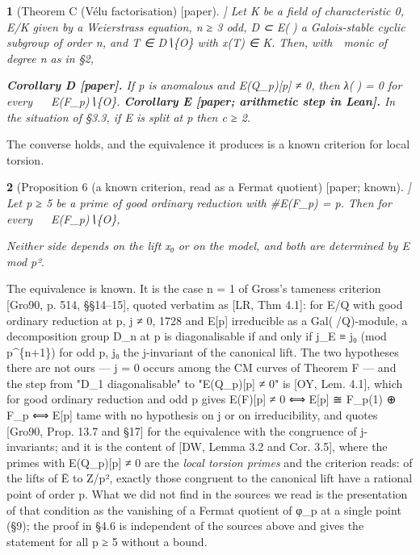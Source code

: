 \documentclass[11pt,a4paper]{article}
\theoremstyle{named}
\newtheorem*{namedthm}{}
\newcommand{\dispf}[1]{\par\smallskip{\centering #1\par}\smallskip}
\begin{document}
\begin{namedthm}[Theorem C (Vélu factorisation) [paper]]
Let K be a field of characteristic 0, E/K given by a Weierstrass equation, n ≥ 3 odd, D ⊂ E() a Galois-stable cyclic subgroup of order n, and T ∈ D∖\{O\} with x(T) ∈ K. Then, with  monic of degree n as in §2,
\dispf{φ\_n(x(T)) = (x(T))\textasciicircum{}n.}
\textbf{Corollary D [paper].} If p is anomalous and E(Q\_p)[p] ≠ 0, then λ() = 0 for every  ∈ E(F\_p)∖\{O\}.
\textbf{Corollary E [paper; arithmetic step in Lean].} In the situation of §3.3, if E is split at p then c ≥ 2.
\end{namedthm}

The converse holds, and the equivalence it produces is a known criterion for local torsion.

\begin{namedthm}[Proposition 6 (a known criterion, read as a Fermat quotient) [paper; known]]
Let p ≥ 5 be a prime of good ordinary reduction with \#E(F\_p) = p. Then for every  ∈ E(F\_p)∖\{O\},
\dispf{λ() = 0  ⟺  E(Q\_p)[p] ≠ 0.}
Neither side depends on the lift x₀ or on the model, and both are determined by E mod p².
\end{namedthm}

The equivalence is known. It is the case n = 1 of Gross's tameness criterion [Gro90, p. 514, §§14–15], quoted verbatim as [LR, Thm 4.1]: for E/Q with good ordinary reduction at p, j ≠ 0, 1728 and E[p] irreducible as a Gal(/Q)-module, a decomposition group D\_n at p is diagonalisable if and only if j\_E ≡ j₀ (mod p\textasciicircum{}\{n+1\}) for odd p, j₀ the j-invariant of the canonical lift. The two hypotheses there are not ours — j = 0 occurs among the CM curves of Theorem F — and the step from "D\_1 diagonalisable" to "E(Q\_p)[p] ≠ 0" is [OY, Lem. 4.1], which for good ordinary reduction and odd p gives E(F)[p] ≠ 0 ⟺ E[p] ≅ F\_p(1) ⊕ F\_p ⟺ E[p] tame with no hypothesis on j or on irreducibility, and quotes [Gro90, Prop. 13.7 and §17] for the equivalence with the congruence of j-invariants; and it is the content of [DW, Lemma 3.2 and Cor. 3.5], where the primes with E(Q\_p)[p] ≠ 0 are the \textit{local torsion primes} and the criterion reads: of the lifts of Ē to Z/p², exactly those congruent to the canonical lift have a rational point of order p. What we did not find in the sources we read is the presentation of that condition as the vanishing of a Fermat quotient of φ\_p at a single point (§9); the proof in §4.6 is independent of the sources above and gives the statement for all p ≥ 5 without a bound.
\end{document}
